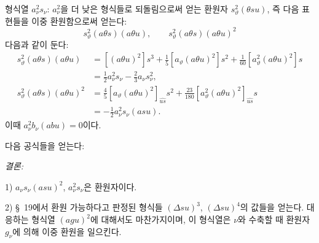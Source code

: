 형식열 $a_\nu^2s_\nu$: $a_\nu^2$을 더 낮은 형식들로 되돌림으로써 얻는 환원자 $s_\vartheta^2(\theta su)$, 즉 다음 표현들을 이중 환원함으로써 얻는다:
\[
s_\vartheta^2(a\theta s)(a\theta u),\qquad
s_\vartheta^2(a\theta s)(a\theta u)^2
\]
다음과 같이 둔다:
\[
\begin{aligned}
s_\vartheta^2(a\theta s)(a\theta u)
&=[(a\theta u)^2]s^3+\frac15[a_\vartheta(a\theta u)^2]s^2+\frac1{60}[a_\vartheta^2(a\theta u)^2]s\\
&=\frac12a_\nu^2s_\nu-\frac23a_\nu s_\nu^2,\\
s_\vartheta^2(a\theta s)(a\theta u)^2
&=\frac45[a_\vartheta(a\theta u)^2]_{\widehat{us}}s^2+\frac{23}{180}[a_\vartheta^2(a\theta u)^2]_{\widehat{us}}s\\
&=-\frac12a_\nu^2s_\nu(asu).
\end{aligned}
\]
이때 $a_\nu^2b_\nu(abu)=0$이다.

다음 공식들을 얻는다:

\noindent\emph{결론:}

1) $a_\nu s_\nu(asu)^2$, $a_\nu^2s_\nu$은 환원자이다.

2) \S\ 19에서 환원 가능하다고 판정된 형식들 $(\Delta su)^3$, $(\Delta su)^4$의 값들을 얻는다. 대응하는 형식열 $(agu)^2$에 대해서도 마찬가지이며, 이 형식열은 $\nu$와 수축할 때 환원자 $g_\nu$에 의해 이중 환원을 일으킨다.

